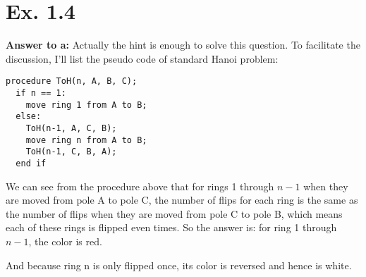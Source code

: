 \documentclass[a4paper,11pt]{article}
\theoremstyle{mytheor}
\begin{document}
\section*{Ex. 1.4}
\textbf{Answer to a:} Actually the hint is enough to solve this question. To facilitate the discussion, I'll list the pseudo code of standard Hanoi problem:


\begin{lstlisting}[label={list:seventh},caption=Standard Tower of Hanoi procedure.]
procedure ToH(n, A, B, C);
  if n == 1:
    move ring 1 from A to B;
  else:
    ToH(n-1, A, C, B);
    move ring n from A to B;
    ToH(n-1, C, B, A);
  end if
\end{lstlisting}
We can see from the procedure above that for rings 1 through $n-1$ when they are moved from pole A to pole C, the number of flips for each ring is the same as the number of flips when they are moved from pole C to pole B, which means each of these rings is flipped even times. So the answer is: for ring 1 through $n-1$, the color is red.

\noindent And because ring n is only flipped once, its color is reversed and hence is white.
\end{document}
